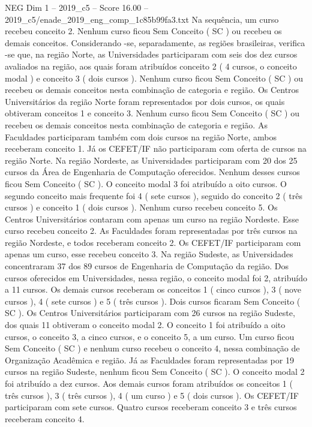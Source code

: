 \begin{textsample}{NEG Dim 1 – 2019\_c5 – Score 16.00 – 2019\_c5/enade\_2019\_eng\_comp\_1c85b99fa3.txt}
Na sequência, um curso recebeu conceito 2.
Nenhum curso ficou Sem Conceito ( SC ) ou recebeu os demais conceitos.
Considerando -se, separadamente, as regiões brasileiras, verifica -se que, na região Norte, as Universidades participaram com seis dos dez cursos avaliados na região, aos quais foram atribuídos conceito 2 ( 4 cursos, o conceito modal ) e conceito 3 ( dois cursos ).
Nenhum curso ficou Sem Conceito ( SC ) ou recebeu os demais conceitos nesta combinação de categoria e região.
Os Centros Universitários da região Norte foram representados por dois cursos, os quais obtiveram conceitos 1 e conceito 3.
Nenhum curso ficou Sem Conceito ( SC ) ou recebeu os demais conceitos nesta combinação de categoria e região.
As Faculdades participaram também com dois cursos na região Norte, ambos receberam conceito 1.
Já os CEFET/IF não participaram com oferta de cursos na região Norte.
Na região Nordeste, as Universidades participaram com 20 dos 25 cursos da Área de Engenharia de Computação oferecidos.
Nenhum desses cursos ficou Sem Conceito ( SC ).
O conceito modal 3 foi atribuído a oito cursos.
O segundo conceito mais frequente foi 4 ( sete cursos ), seguido do conceito 2 ( três cursos ) e conceito 1 ( dois cursos ).
Nenhum curso recebeu conceito 5.
Os Centros Universitários contaram com apenas um curso na região Nordeste.
Esse curso recebeu conceito 2.
As Faculdades foram representadas por três cursos na região Nordeste, e todos receberam conceito 2.
Os CEFET/IF participaram com apenas um curso, esse recebeu conceito 3.
Na região Sudeste, as Universidades concentraram 37 dos 89 cursos de Engenharia de Computação da região.
Dos cursos oferecidos em Universidades, nessa região, o conceito modal foi 2, atribuído a 11 cursos.
Os demais cursos receberam os conceitos 1 ( cinco cursos ), 3 ( nove cursos ), 4 ( sete cursos ) e 5 ( três cursos ).
Dois cursos ficaram Sem Conceito ( SC ).
Os Centros Universitários participaram com 26 cursos na região Sudeste, dos quais 11 obtiveram o conceito modal 2.
O conceito 1 foi atribuído a oito cursos, o conceito 3, a cinco cursos, e o conceito 5, a um curso.
Um curso ficou Sem Conceito ( SC ) e nenhum curso recebeu o conceito 4, nessa combinação de Organização Acadêmica e região.
Já as Faculdades foram representadas por 19 cursos na região Sudeste, nenhum ficou Sem Conceito ( SC ).
O conceito modal 2 foi atribuído a dez cursos.
Aos demais cursos foram atribuídos os conceitos 1 ( três cursos ), 3 ( três cursos ), 4 ( um curso ) e 5 ( dois cursos ).
Os CEFET/IF participaram com sete cursos.
Quatro cursos receberam conceito 3 e três cursos receberam conceito 4.

\end{textsample}
